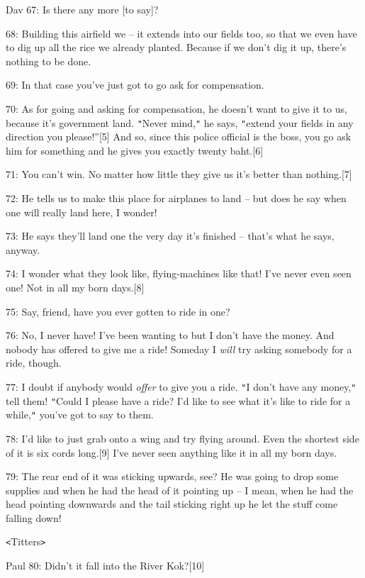\leftskip=0pt
{Dav 67: Is there any more [to say]? }

{68: Building this airfield we -- it extends into our fields too, so that
we even have to dig up all the rice we already planted. Because if we don't dig
it up, there's nothing to be done. }

{69: In that case you've just got to go ask for compensation.}

{70: As for going and asking for compensation, he doesn't want to give it
to us, because it's government land. \texttt{"}Never mind,\texttt{"} he says, \texttt{"}extend
your fields in any direction you please!''[5] And so, since this police official
is the boss, you go ask him for something and he gives you exactly twenty baht.[6]}

{71: You can't win. No matter how little they give us it's better than nothing.[7]}

{72: He tells us to make this place for airplanes to land -- but does he
say when one will really land here, I wonder!}

{73: He says they'll land one the very day it's finished -- that's what
he says, anyway.}

{74: I wonder what they look like, flying-machines like that! I've never
even seen one! Not in all my born days.[8]}

{75: Say, friend, have you ever gotten to ride in one?}

{76: No, I never have! I've been wanting to but I don't have the money.
And nobody has offered to give me a ride! Someday I }{\textit{will}}{
try asking somebody for a ride, though. }

{77: I doubt if anybody would }{\textit{offer}}{ to give you
a ride. \texttt{"}I don't have any money,\texttt{"} tell them! \texttt{"}Could
I please have a ride? I'd like to see what it's like to ride for a while,\texttt{"}
you've got to say to them. }

{78: I'd like to just grab onto a wing and try flying around. Even the shortest
side of it is six cords long.[9] I've never seen anything like it in all my born
days. }

{79: The rear end of it was sticking upwards, see? He was going to drop
some supplies and when he had the head of it pointing up -- I mean, when he had
the head pointing downwards and the tail sticking right up he let the stuff come
falling down! }

{\texttt{<}Titters\texttt{>}}

{Paul 80: Didn't it fall into the River Kok?[10] }

